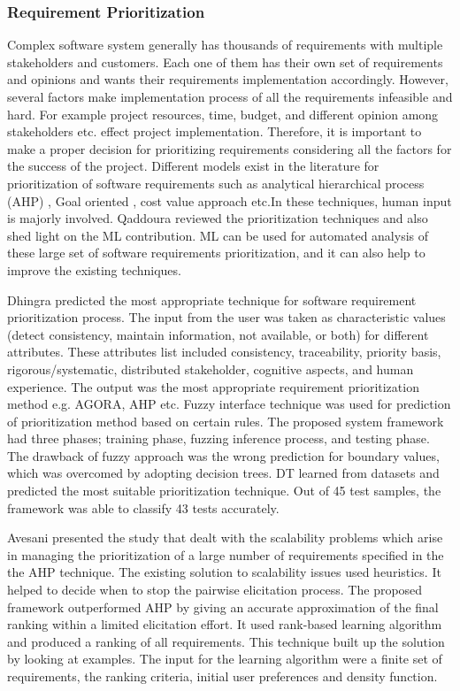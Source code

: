 \subsubsection{Requirement Prioritization}
Complex software system generally has thousands of requirements with multiple
stakeholders and customers. Each one of them has their own set of requirements
and opinions and wants their requirements implementation accordingly. However,
several factors make implementation process of all the requirements infeasible
and hard. For example project resources, time, budget, and different opinion among
stakeholders etc. effect project implementation. Therefore, it
is important to make a proper decision for prioritizing requirements considering
all the factors for the success of the project. Different models exist in the
literature for prioritization of software requirements such as analytical
hierarchical process (AHP) \cite{saaty2008}, Goal oriented
\cite{VanLamsweerde:2001}, cost value approach \cite{Karlsson:1997} etc.In these
techniques, human input is majorly involved. Qaddoura \etal \cite{RQaddoura}
reviewed the prioritization techniques and also shed light on the ML
contribution. ML can be used for automated analysis of these large set of
software requirements prioritization, and it can also help to improve the existing techniques.

	Dhingra \etal  \cite{S.Dhingra} predicted the most appropriate technique for
software requirement prioritization process. The input from the user was taken as characteristic values (detect consistency, maintain information, not available, or both) for different attributes. These attributes list included consistency,
traceability, priority basis, rigorous/systematic, distributed stakeholder,
cognitive aspects, and human experience. The output was the
most appropriate requirement prioritization method e.g. AGORA, AHP etc. Fuzzy interface technique was
used for prediction of prioritization method based on certain rules. The
proposed system framework had three phases; training phase, fuzzing inference
process, and testing phase. The drawback of fuzzy approach was the wrong prediction
for boundary values, which was overcomed by adopting decision trees. DT learned from datasets and
predicted the most suitable prioritization technique. Out of 45 test samples, the
framework was able to classify 43 tests accurately.

	Avesani \etal\cite{PAvesani} presented the study that dealt with the scalability
problems which arise in managing the prioritization of a large number of
requirements specified in the the AHP technique. The existing solution to
scalability issues used heuristics. It helped to decide when to stop the pairwise
elicitation process. The proposed framework outperformed AHP by giving an
accurate approximation of the final ranking within a limited elicitation effort. It used rank-based
learning algorithm and produced a ranking of all requirements. This technique
built up the solution by looking at examples. The input for the learning
algorithm were a finite set of requirements, the ranking criteria, initial user
preferences and density function.

